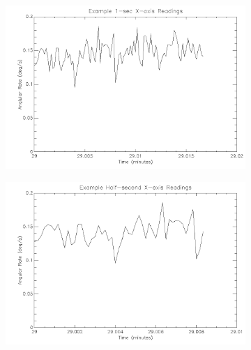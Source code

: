 {\begin{figure}[htbp]
\captionsetup[subfigure]{justification=centering}
\captionsetup{justification=centering}
    \centering
	\begin{subfigure}{0.45\textwidth}
		\includegraphics[width=1\linewidth]{appendix/img/campaign_results/gyrox1sec.png}
		\caption{}
		\label{fig:sub:gyrox1}
	\end{subfigure}
	\begin{subfigure}{0.45\textwidth}
		\includegraphics[width=1\linewidth]{appendix/img/campaign_results/gyroxhalfsec.png}
		\caption{}
		\label{fig:sub:gyroxh}
	\end{subfigure}
	\begin{subfigure}{0.45\textwidth}

\end{subfigure}
\end{figure}}
